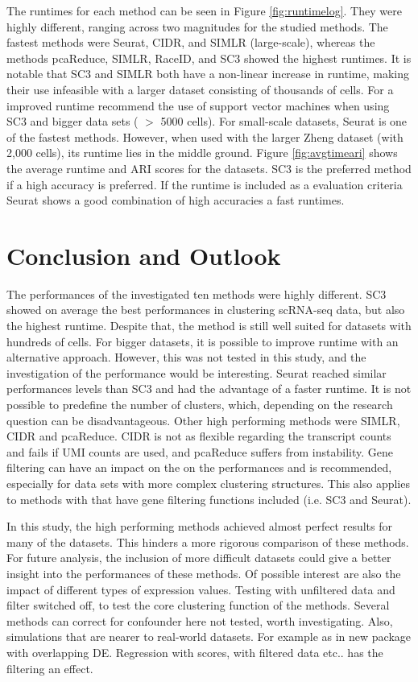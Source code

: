 \documentclass[12pt, a4paper]{article}\usepackage[]{graphicx}\usepackage[]{color}
\begin{document}
The runtimes for each method can be seen in Figure \ref{fig:runtimelog}. They were highly different, ranging across two magnitudes for the studied methods. The fastest methods were Seurat, CIDR, and SIMLR (large-scale), whereas the methods pcaReduce, SIMLR, RaceID, and SC3 showed the highest runtimes. It is notable that SC3 and SIMLR both have a non-linear increase in runtime, making their use infeasible with a larger dataset consisting of thousands of cells. For a improved runtime \citet{kiselev2017sc3} recommend the use of support vector machines when using SC3 and bigger data sets ( $>$ 5000 cells). For small-scale datasets, Seurat is one of the fastest methods. However, when used with the larger Zheng dataset (with 2,000 cells), its runtime lies in the middle ground.
Figure \ref{fig:avgtimeari} shows the average runtime and ARI scores for the datasets. SC3 is the preferred method if a high accuracy is preferred. If the runtime is included as a evaluation criteria Seurat shows a good combination of high accuracies a fast runtimes.  
\newpage
\section{Conclusion and Outlook} 
The performances of the investigated ten methods were highly different. SC3 showed on average the best performances in clustering scRNA-seq data, but also the highest runtime. Despite that, the method is still well suited for datasets with hundreds of cells.  For bigger datasets, it is possible to improve runtime with an alternative approach. However, this was not tested in this study, and the investigation of the performance would be interesting. Seurat reached similar performances levels than SC3 and had the advantage of a faster runtime.  It is not possible to predefine the number of clusters, which, depending on the research question can be disadvantageous. Other high performing methods were SIMLR, CIDR and pcaReduce. CIDR is not as flexible regarding the transcript counts and fails if UMI counts are used, and pcaReduce suffers from instability. 
Gene filtering can have an impact on the on the performances and is recommended, especially for data sets with more complex clustering structures. This also applies to methods with that have gene filtering functions included (i.e. SC3 and Seurat).

In this study, the high performing methods achieved almost perfect results for many of the datasets. This hinders a more rigorous comparison of these methods. For future analysis, the inclusion of more difficult datasets could give a better insight into the performances of these methods.  Of possible interest are also the impact of different types of expression values. Testing with unfiltered data and filter switched off, to test the core clustering function of the methods. Several methods can correct for confounder here not tested, worth investigating. Also, simulations that are nearer to real-world datasets. For example as in new package with overlapping DE. Regression with scores, with filtered data etc.. has the filtering an effect. 
\end{document}
